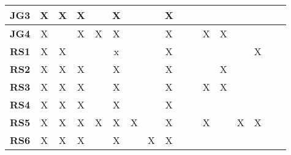 \documentclass[12pt]{article}
\begin{document}
\begin{table}[H]
\begin{adjustwidth}{-0.1in}{-1in}
{\begin{tabular}{c|c|c|c|c|c|c|c|c|c|c|c|c|c|c|c|c|}
\multicolumn{1}{|l|}{\textbf{JG3}}   &      X       &      X       &       X      &              &       X      &              &              &       X      &              &              &              &              &              &              &              &               \\ \hline
\multicolumn{1}{|l|}{\textbf{JG4}}   &      X       &              &       X      &      X       &       X      &              &              &       X      &              &              &      X       &      X       &              &              &              &               \\ \hline
\multicolumn{1}{|l|}{\textbf{RS1}}   &      X       &      X       &              &              &       x      &              &              &       X      &              &              &              &              &              &      X       &              &               \\ \hline
\multicolumn{1}{|l|}{\textbf{RS2}}   &      X       &      X       &       X      &              &       X      &              &              &       X      &              &              &              &      X       &              &              &              &               \\ \hline
\multicolumn{1}{|l|}{\textbf{RS3}}   &      X       &      X       &       X      &              &       X      &              &              &       X      &              &              &      X       &      X       &              &              &              &               \\ \hline
\multicolumn{1}{|l|}{\textbf{RS4}}   &      X       &      X       &       X      &              &       X      &              &              &       X      &              &              &              &              &              &              &              &               \\ \hline
\multicolumn{1}{|l|}{\textbf{RS5}}   &      X       &      X       &       X      &      X       &       X      &      X       &              &       X      &              &              &      X       &              &      X       &      X       &              &               \\ \hline
\multicolumn{1}{|l|}{\textbf{RS6}}   &      X       &      X       &       X      &              &       X      &              &       X      &       X      &              &              &              &              &              &              &              &               \\ \hline

\end{tabular}}
\end{adjustwidth}
\end{table}
\end{document}
